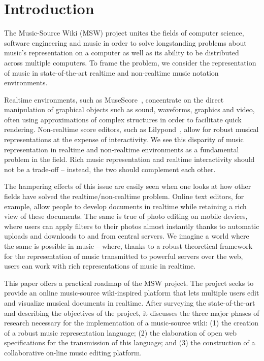 \documentclass{article}
\title{\papertitle}
\begin{document}
%
\capstartfalse
\maketitle
\capstarttrue
%
\begin{abstract}
The abstract should be placed at the top left column and should contain about 150–-200 words.
\end{abstract}
%

\section{Introduction}\label{sec:introduction}
The Music-Source Wiki (MSW) project unites the fields of computer science, software
engineering and music in order to solve longstanding problems about music’s
representation on a computer as well as its ability to be distributed across
multiple computers. To frame the problem, we consider the representation of
music in state-of-the-art real\-time and non-real\-time music notation
environments.

Realtime environments, such as MuseScore~\cite{musescore}, concentrate on
the direct manipulation of graphical objects such as sound, waveforms,
graphics and video, often using approximations of complex structures in
order to facilitate quick rendering. Non-real\-time score editors, such as
Lilypond~\cite{lilypond06}, allow for robust musical representations at the expense of
interactivity. We see this disparity of music representation in real\-time and
non-real\-time environments as a fundamental problem in the field. Rich music
representation and real\-time interactivity should not be a trade-off –
instead, the two should complement each other.

The hampering effects of this issue are easily seen when one looks at how
other fields have solved the real\-time/non-real\-time problem. Online text
editors, for example, allow people to develop documents in real\-time while
retaining a rich view of these documents. The same is true of photo editing
on mobile devices, where users can apply filters to their photos almost
instantly thanks to automatic uploads and downloads to and from central
servers. We imagine a world where the same is possible in music – where,
thanks to a robust theoretical framework for the representation of music
transmitted to powerful servers over the web, users can work with rich
representations of music in real\-time.

This paper offers a practical roadmap
of the MSW project. The project seeks to provide an online music-source
wiki-inspired platform that lets multiple users edit and visualize
musical documents in realtime. After surveying the
state-of-the-art and describing the objectives of the project,
it discusses the three major phases of research necessary
for the implementation of a music-source wiki: (1) the creation of a robust
music representation language; (2) the elaboration of open web
specifications for the transmission of this language; and (3) the
construction of a collaborative on-line music editing platform.
\end{document}
